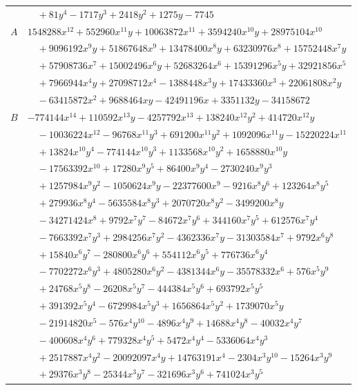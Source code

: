\documentclass[11pt]{article}
\begin{document}
\begin{longtable}{@{}ll@{}}
 & $\quad +81y^{4}-1717y^{3}+2418y^{2}+1275y-7745$\\
$A$ & $1548288x^{12}+552960x^{11}y+10063872x^{11}+3594240x^{10}y+28975104x^{10}$\\
 & $\quad +9096192x^{9}y+51867648x^{9}+13478400x^{8}y+63230976x^{8}+15752448x^{7}y$\\
 & $\quad +57908736x^{7}+15002496x^{6}y+52683264x^{6}+15391296x^{5}y+32921856x^{5}$\\
 & $\quad +7966944x^{4}y+27098712x^{4}-1388448x^{3}y+17433360x^{3}+22061808x^{2}y$\\
 & $\quad -63415872x^{2}+9688464xy-42491196x+3351132y-34158672$\\
$B$ & $-774144x^{14}+110592x^{13}y-4257792x^{13}+138240x^{12}y^{2}+414720x^{12}y$\\
 & $\quad -10036224x^{12}-96768x^{11}y^{3}+691200x^{11}y^{2}+1092096x^{11}y-15220224x^{11}$\\
 & $\quad +13824x^{10}y^{4}-774144x^{10}y^{3}+1133568x^{10}y^{2}+1658880x^{10}y$\\
 & $\quad -17563392x^{10}+17280x^{9}y^{5}+86400x^{9}y^{4}-2730240x^{9}y^{3}$\\
 & $\quad +1257984x^{9}y^{2}-1050624x^{9}y-22377600x^{9}-9216x^{8}y^{6}+123264x^{8}y^{5}$\\
 & $\quad +279936x^{8}y^{4}-5635584x^{8}y^{3}+2070720x^{8}y^{2}-3499200x^{8}y$\\
 & $\quad -34271424x^{8}+9792x^{7}y^{7}-84672x^{7}y^{6}+344160x^{7}y^{5}+612576x^{7}y^{4}$\\
 & $\quad -7663392x^{7}y^{3}+2984256x^{7}y^{2}-4362336x^{7}y-31303584x^{7}+9792x^{6}y^{8}$\\
 & $\quad +15840x^{6}y^{7}-280800x^{6}y^{6}+554112x^{6}y^{5}+776736x^{6}y^{4}$\\
 & $\quad -7702272x^{6}y^{3}+4805280x^{6}y^{2}-4381344x^{6}y-35578332x^{6}+576x^{5}y^{9}$\\
 & $\quad +24768x^{5}y^{8}-26208x^{5}y^{7}-444384x^{5}y^{6}+693792x^{5}y^{5}$\\
 & $\quad +391392x^{5}y^{4}-6729984x^{5}y^{3}+1656864x^{5}y^{2}+1739070x^{5}y$\\
 & $\quad -21914820x^{5}-576x^{4}y^{10}-4896x^{4}y^{9}+14688x^{4}y^{8}-40032x^{4}y^{7}$\\
 & $\quad -400608x^{4}y^{6}+779328x^{4}y^{5}+5472x^{4}y^{4}-5336064x^{4}y^{3}$\\
 & $\quad +2517887x^{4}y^{2}-20092097x^{4}y+14763191x^{4}-2304x^{3}y^{10}-15264x^{3}y^{9}$\\
 & $\quad +29376x^{3}y^{8}-25344x^{3}y^{7}-321696x^{3}y^{6}+741024x^{3}y^{5}$\\

\end{longtable}
\end{document}
